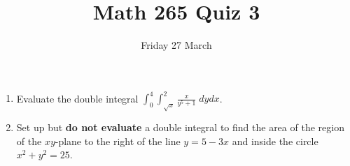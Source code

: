 \documentclass[12pt]{article}
\title{Math 265 Quiz 3}\author{}\date{Friday 27 March}
\begin{document}
\maketitle
\thispagestyle{empty}
\begin{enumerate}
\item Evaluate the double integral
$\int_0^4\int_{\sqrt{x}}^2\frac{x}{y^5+1}\;dydx$.
\vspace{3in}
\item Set up but {\bf do not evaluate} a double integral
to find the area of the region of the $xy$-plane
to the right of the line $y=5-3x$ and inside the circle
$x^2+y^2=25$.
\end{enumerate}
\end{document}
